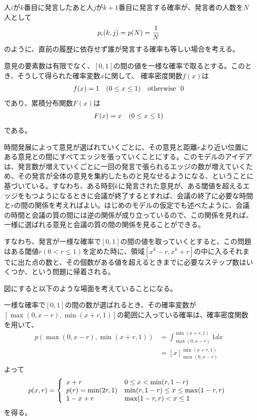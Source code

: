 \documentclass[letterpaper,10pt,english]{sphinxmanual}
\begin{document}
人\(i\)が\(k\)番目に発言したあと人\(j\)が\(k+1\)番目に発言する確率が、発言者の人数を\(N\)人として
\begin{gather}
\begin{split}p_{i}(k,j) = p(N) = \frac{1}{N}\end{split}\notag
\end{gather}
のように、直前の履歴に依存せず誰が発言する確率も等しい場合を考える。

意見の要素数は有限でなく、\([0,1]\)の間の値を一様な確率で取るとする。このとき、そうして得られた確率変数\(x\)に関して、
確率密度関数\(f(x)\)は
\begin{gather}
\begin{split}f(x) = 1\ \ \ (0\le x \le 1)\ \ \ \text{otherwise}\ \ 0\end{split}\notag
\end{gather}
であり、累積分布関数\(F(x)\)は
\begin{gather}
\begin{split}F(x) = x\ \ \ (0\le x \le 1)\end{split}\notag
\end{gather}
である。

時間発展によって意見が選ばれていくごとに、その意見と距離\(r\)より近い位置にある意見との間にすべてエッジを張っていくことにする。このモデルのアイデアは、発言数が増えていくごとに一回の発言で張られるエッジの数が増えていくため、その発言が全体の意見を集約したものと見なせるようになる、ということに基づいている。すなわち、ある時刻\(k\)に発言された意見が、ある閾値を超えるエッジをもつようになるときに会議が終了するとすれば、会議の終了に必要な時間と\(r\)の間の関係を考えればよい。はじめのモデルの仮定でも述べたように、会議の時間と会議の質の間には逆の関係が成り立っているので、この関係を見れば、一様に選ばれる意見と会議の質の間の関係を見ることができる。

すなわち、発言が一様な確率で\([0,1]\)の間の値を取っていくとすると、この問題はある閾値\(r(0<r\le1)\)を定めた時に、領域\([x^{k}-r, x^{k}+r]\)の中に入るそれまでに出た点の数と、その個数がある値を超えるときまでに必要なステップ数はいくつか、という問題に帰着される。

図にすると以下のような場面を考えていることになる。

一様な確率で\([0,1]\)の間の数が選ばれるとき、その確率変数が\([\max(0,x-r), \min(x+r,1)]\)の範囲に入っている確率は、確率密度関数を用いて、
\begin{align}
p(\max(0, x-r), \min(x+r, 1)) &= \int ^{\min(x+r,1)}_{\max(0, x-r)} 1 dx \\
&= \left[ x\right]^{\min(x+r,1)}_{\max(0, x-r)}\\
\end{align}
よって
\begin{gather}
\begin{split}p(x,r)= \left\{ \begin{array}{ll}x+r & 0\le x< \min(r,1-r) \\
p(r) = \min(2r, 1) & \min(r, 1-r)\le x \le \max(1-r, r) \\
1 - x+r & \max(1-r, r) < x \le 1
\end{array}\right.\end{split}\notag
\end{gather}
を得る。
\end{document}
